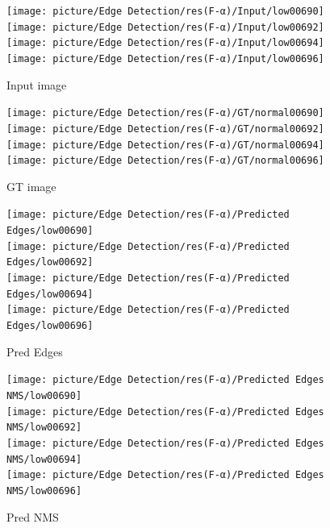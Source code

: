 \documentclass[CJK,aspectratio=169]{beamer}  %
\begin{document}
	\begin{frame}
		\begin{figure}
		\centering	
		\begin{minipage}{0.61\linewidth}
			\centering	
			\setlength{\abovecaptionskip}{-0.05cm}
			\begin{minipage}{0.16\textwidth}
				\texttt{[image: picture/Edge Detection/res(F-α)/Input/low00690]} \\					
				\texttt{[image: picture/Edge Detection/res(F-α)/Input/low00692]} \\
				\texttt{[image: picture/Edge Detection/res(F-α)/Input/low00694]} \\
				\texttt{[image: picture/Edge Detection/res(F-α)/Input/low00696]}
				\caption*{\tiny Input image}
			\end{minipage}
			\begin{minipage}{0.16\textwidth}
				\texttt{[image: picture/Edge Detection/res(F-α)/GT/normal00690]} \\
				\texttt{[image: picture/Edge Detection/res(F-α)/GT/normal00692]} \\
				\texttt{[image: picture/Edge Detection/res(F-α)/GT/normal00694]} \\
				\texttt{[image: picture/Edge Detection/res(F-α)/GT/normal00696]}
				\caption*{\tiny GT image}
			\end{minipage}
			\begin{minipage}{0.16\textwidth}
				\texttt{[image: picture/Edge Detection/res(F-α)/Predicted Edges/low00690]} \\
				\texttt{[image: picture/Edge Detection/res(F-α)/Predicted Edges/low00692]} \\
				\texttt{[image: picture/Edge Detection/res(F-α)/Predicted Edges/low00694]} \\
				\texttt{[image: picture/Edge Detection/res(F-α)/Predicted Edges/low00696]}
				\caption*{\tiny Pred Edges}
			\end{minipage}
			\begin{minipage}{0.16\textwidth}
				\texttt{[image: picture/Edge Detection/res(F-α)/Predicted Edges NMS/low00690]} \\
				\texttt{[image: picture/Edge Detection/res(F-α)/Predicted Edges NMS/low00692]} \\
				\texttt{[image: picture/Edge Detection/res(F-α)/Predicted Edges NMS/low00694]} \\
				\texttt{[image: picture/Edge Detection/res(F-α)/Predicted Edges NMS/low00696]}
				\caption*{\tiny Pred NMS}
			\end{minipage}

\end{minipage}
\end{figure}
\end{frame}
\end{document}
